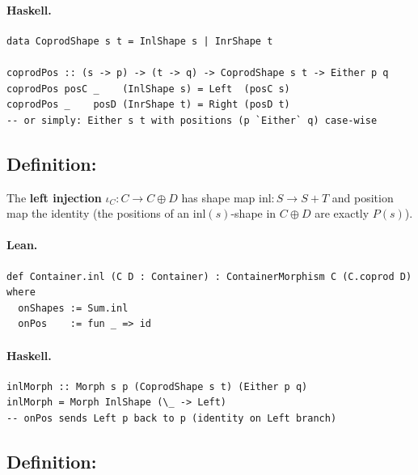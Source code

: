 \documentclass[11pt,a4paper]{article}
\begin{document}
\paragraph{Haskell.}
\begin{lstlisting}[style=haskell]
data CoprodShape s t = InlShape s | InrShape t

coprodPos :: (s -> p) -> (t -> q) -> CoprodShape s t -> Either p q
coprodPos posC _    (InlShape s) = Left  (posC s)
coprodPos _    posD (InrShape t) = Right (posD t)
-- or simply: Either s t with positions (p `Either` q) case-wise
\end{lstlisting}


\subsection{Definition: }

\begin{defn}
The \textbf{left injection} $\iota_C : C \to C \oplus D$ has shape map
$\mathrm{inl} : S \to S + T$ and position map the identity (the positions of an
$\mathrm{inl}(s)$-shape in $C \oplus D$ are exactly $P(s)$).
\end{defn}

\paragraph{Lean.}
\begin{lstlisting}[style=lean]
def Container.inl (C D : Container) : ContainerMorphism C (C.coprod D) where
  onShapes := Sum.inl
  onPos    := fun _ => id
\end{lstlisting}

\paragraph{Haskell.}
\begin{lstlisting}[style=haskell]
inlMorph :: Morph s p (CoprodShape s t) (Either p q)
inlMorph = Morph InlShape (\_ -> Left)
-- onPos sends Left p back to p (identity on Left branch)
\end{lstlisting}


\subsection{Definition: }
\end{document}
